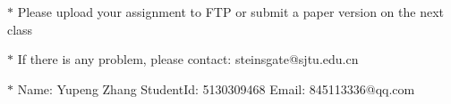 \documentclass[12pt,a4paper]{article}
\theoremstyle{definition}
\numberwithin{equation}{section}
\numberwithin{figure}{section}
\begin{document}
\noindent

\noindent{}
\begin{center}
\footnotesize{\color{red}$*$ Please upload your assignment to FTP or submit a paper version on the next class}

\footnotesize{\color{red}$*$ If there is any problem, please contact: steinsgate@sjtu.edu.cn}

\footnotesize{\color{blue}$*$ Name: Yupeng Zhang \quad StudentId: 5130309468     \quad Email: 845113336@qq.com}
\end{center}
\end{document}
